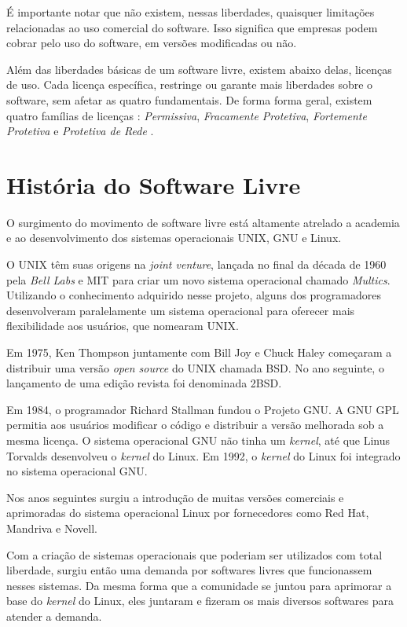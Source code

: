 É importante notar que não existem, nessas liberdades, quaisquer limitações relacionadas ao uso comercial do software. Isso significa que empresas podem cobrar pelo uso do software, em versões modificadas ou não.

Além das liberdades básicas de um software livre, existem abaixo delas, licenças de uso. Cada licença específica, restringe ou garante mais liberdades sobre o software, sem afetar as quatro fundamentais. De forma forma geral, existem quatro famílias de licenças : \textit{Permissiva},  \textit{Fracamente Protetiva},  \textit{Fortemente Protetiva} e \textit{Protetiva de Rede} \cite{Williams}. 

\section{História do Software Livre}
O surgimento do movimento de software livre está altamente atrelado a academia e ao desenvolvimento dos sistemas operacionais UNIX, GNU e Linux.

O UNIX têm suas origens na \textit{joint venture}, lançada no final da década de 1960 pela \textit{Bell Labs} e MIT para criar um novo sistema operacional chamado \textit{Multics}. Utilizando o conhecimento adquirido nesse projeto, alguns dos programadores desenvolveram paralelamente um sistema operacional para oferecer mais flexibilidade aos usuários, que nomearam UNIX. 

Em 1975, Ken Thompson juntamente com Bill Joy e Chuck Haley começaram a distribuir uma versão \textit{open source} do UNIX chamada BSD. No ano seguinte, o lançamento de uma edição revista foi denominada 2BSD.

Em 1984, o programador Richard Stallman fundou o Projeto GNU. A GNU GPL permitia aos usuários modificar o código e distribuir a versão melhorada sob a mesma licença. O sistema operacional GNU não tinha um \textit{kernel}, até que Linus Torvalds desenvolveu o \textit{kernel} do Linux. Em 1992, o \textit{kernel} do Linux foi integrado no sistema operacional GNU.

Nos anos seguintes surgiu a introdução de muitas versões comerciais e aprimoradas do sistema operacional Linux por fornecedores como Red Hat, Mandriva e Novell.

Com a criação de sistemas operacionais que poderiam ser utilizados com total liberdade, surgiu então uma demanda por softwares livres que funcionassem nesses sistemas. Da mesma forma que a comunidade se juntou para aprimorar a base do \textit{kernel} do Linux, eles juntaram e fizeram os mais diversos softwares para atender a demanda. 

